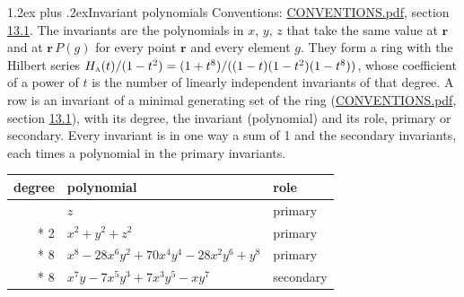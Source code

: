 \documentclass[10pt,a4paper]{article}
\makeatletter
\renewcommand\section{\@startsection{section}{1}{\z@}{-3ex plus -1ex minus -.2ex}%
  {1.2ex plus .2ex}{\normalfont\large\sffamily\bfseries\color{parttitle}}}
\numberwithin{equation}{section}
\newcommand{\irr}[1]{\text{\normalfont\scshape #1}}
\newcommand{\pointr}{\mathbf{r}}
\makeatother
\begin{document}
\section{Invariant polynomials}\label{s:invariant_polynomials}
Conventions: \href{../../CONVENTIONS.pdf}{CONVENTIONS.pdf}, section \href{../../CONVENTIONS.pdf\#conv.13.1}{13.1}.
The invariants are the polynomials in $x$, $y$, $z$ that take the same value at $\pointr$ and at $\pointr\,P(g)$ for every point $\pointr$ and every element $g$. They form a ring with the Hilbert series $H_{\irr{a}}(t)/(1-t^{2}) = (1 + t^{8})/((1-t)(1-t^{2})(1-t^{8}))$, whose coefficient of a power of $t$ is the number of linearly independent invariants of that degree. \label{n:head.degree}\label{n:head.role}A row is an invariant of a minimal generating set of the ring (\href{../../CONVENTIONS.pdf}{CONVENTIONS.pdf}, section \href{../../CONVENTIONS.pdf\#conv.13.1}{13.1}), with its degree, the invariant (polynomial) and its role, primary or secondary. Every invariant is in one way a sum of 1 and the secondary invariants, each times a polynomial in the primary invariants.
{\small\begin{longtable}{@{}rll@{}}\toprule
degree & polynomial & role\\\midrule\endhead
\bottomrule\endfoot\endlastfoot
1 & $z$ & primary\\*
2 & $x^{2} + y^{2} + z^{2}$ & primary\\*
8 & $x^{8} - 28x^{6}y^{2} + 70x^{4}y^{4} - 28x^{2}y^{6} + y^{8}$ & primary\\*
8 & $x^{7}y - 7x^{5}y^{3} + 7x^{3}y^{5} - xy^{7}$ & secondary\\
\bottomrule\end{longtable}}
\end{document}
